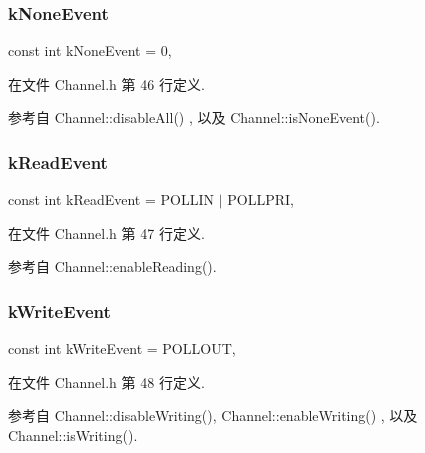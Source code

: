 \subsubsection{\texorpdfstring{k\+None\+Event}{kNoneEvent}}
{\footnotesize\ttfamily const int k\+None\+Event = 0\hspace{0.3cm}{\ttfamily [static]}, {\ttfamily [private]}}



在文件 Channel.\+h 第 46 行定义.



参考自 Channel\+::disable\+All() , 以及 Channel\+::is\+None\+Event().

\mbox{\label{classmuduo_1_1Channel_a7a33491041233f79f0686805e1844694}} 
\subsubsection{\texorpdfstring{k\+Read\+Event}{kReadEvent}}
{\footnotesize\ttfamily const int k\+Read\+Event = P\+O\+L\+L\+IN $\vert$ P\+O\+L\+L\+P\+RI\hspace{0.3cm}{\ttfamily [static]}, {\ttfamily [private]}}



在文件 Channel.\+h 第 47 行定义.



参考自 Channel\+::enable\+Reading().

\mbox{\label{classmuduo_1_1Channel_a050e3f1da6130199bfa2619a60e43f3b}} 
\subsubsection{\texorpdfstring{k\+Write\+Event}{kWriteEvent}}
{\footnotesize\ttfamily const int k\+Write\+Event = P\+O\+L\+L\+O\+UT\hspace{0.3cm}{\ttfamily [static]}, {\ttfamily [private]}}



在文件 Channel.\+h 第 48 行定义.



参考自 Channel\+::disable\+Writing(), Channel\+::enable\+Writing() , 以及 Channel\+::is\+Writing().

